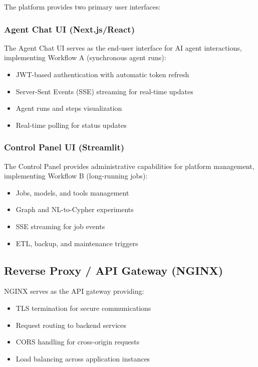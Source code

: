 \documentclass[a4paper,twoside]{sapthesis}
\begin{document}
The platform provides two primary user interfaces:

\subsubsection{Agent Chat UI (Next.js/React)}

The Agent Chat UI serves as the end-user interface for AI agent interactions, implementing Workflow A (synchronous agent runs):

\begin{itemize}
    \item JWT-based authentication with automatic token refresh
    \item Server-Sent Events (SSE) streaming for real-time updates
    \item Agent runs and steps visualization
    \item Real-time polling for status updates
\end{itemize}

\subsubsection{Control Panel UI (Streamlit)}

The Control Panel provides administrative capabilities for platform management, implementing Workflow B (long-running jobs):

\begin{itemize}
    \item Jobs, models, and tools management
    \item Graph and NL-to-Cypher experiments
    \item SSE streaming for job events
    \item ETL, backup, and maintenance triggers
\end{itemize}

\subsection{Reverse Proxy / API Gateway (NGINX)}
\label{subsec:nginx-gateway}

NGINX serves as the API gateway providing:

\begin{itemize}
    \item TLS termination for secure communications
    \item Request routing to backend services
    \item CORS handling for cross-origin requests
    \item Load balancing across application instances
\end{itemize}
\end{document}
